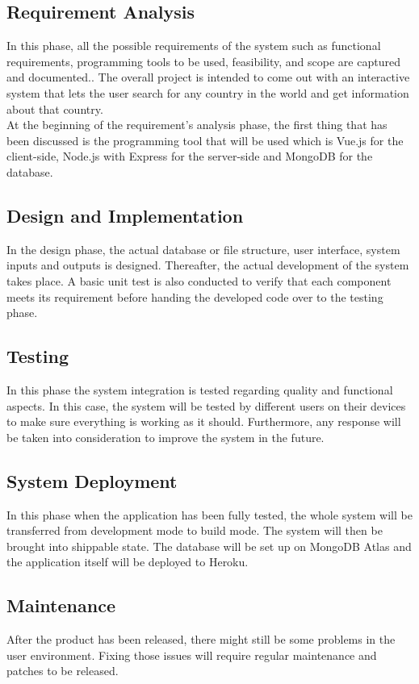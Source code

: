 \documentclass[twoside, a4paper, 12pt]{report}
\begin{document}
\subsection{Requirement Analysis}
In this phase, all the possible requirements of the system such as functional requirements, programming tools to be used, feasibility, and scope are captured and documented.\autocite{petersen2009waterfall}. The overall project is intended to come out with an interactive system that lets the user search for any country in the world and get information about that country.\\
\indent
At the beginning of the requirement's analysis phase, the first thing that has been discussed is the programming tool that will be used which is Vue.js for the client-side, Node.js with Express for the server-side and MongoDB for the database.

\subsection{Design and Implementation}
In the design phase, the actual database or file structure, user interface, system inputs and outputs is designed. Thereafter, the actual development of the system takes place. A basic unit test is also conducted to verify that each component meets its requirement before handing the developed code over to the testing phase.

\subsection{Testing}
In this phase the system integration is tested regarding quality and functional aspects. In this case, the system will be tested by different users on their devices to make sure everything is working as it should. Furthermore, any response will be taken into consideration to improve the system in the future.

\subsection{System Deployment}
In this phase when the application has been fully tested, the whole system will be transferred from development mode to build mode. The system will then be brought into shippable state. The database will be set up on MongoDB Atlas and the application itself will be deployed to Heroku.

\subsection{Maintenance}
After the product has been released, there might still be some problems in the user environment. Fixing those issues will require regular maintenance and patches to be released.
\end{document}

